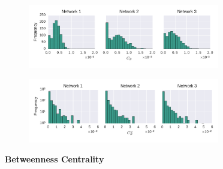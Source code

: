 \begin{figure}[htb]
	\centering
	\begin{subfigure}[b]{1.0\textwidth}
	\centering
	\includegraphics[width=0.92\textwidth]{Figures/stat-betweenDist}
	\label{fig:betweenDistUW}
	\end{subfigure} 
	\begin{subfigure}[b]{1.0\textwidth}
	\centering
	\includegraphics[width=0.92\textwidth]{Figures/stat-betweenWDist}
	\label{fig:betweenDistW}
	\end{subfigure}
	\caption[Betweenness Centrality]{\textbf{Betweenness Centrality}}
	\label{fig:betweenDist}
\end{figure}

